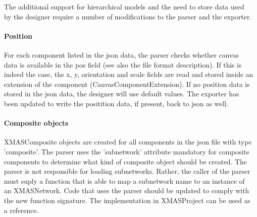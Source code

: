 The additional support for hierarchical models and the need to store data used
by the designer require a number of modifications to the parser and the exporter.

\paragraph{Position}
For each component listed in the json data, the parser checks whether canvas data
is available in the pos field (see also the file format description). If this is
indeed the case, the x, y, orientation and scale fields are read and stored inside
an extension of the component (CanvasComponentExtension). If no position data
is stored in the json data, the designer will use default values. The exporter has
been updated to write the positition data, if present, back to json as well.

\paragraph{Composite objects}
XMASComposite objects are created for all components in the json file with type
'composite'. The parser uses the 'subnetwork' attribute mandatory for composite
components to determine what kind of composite object should be created. The
parser is not responsible for loading subnetworks. Rather, the caller of the parser
must suply a function that is able to map a subnetwork name to an instance of
an XMASNetwork. Code that uses the parser should be updated to comply with the
new function signature. The implementation in XMASProject can be used as a reference.


\newpage

